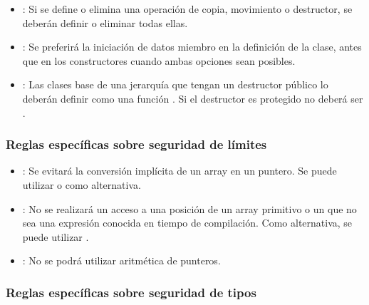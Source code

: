 \begin{itemize}
\item {}:
Si se define o elimina una operación de copia, movimiento o destructor, se
deberán definir o eliminar todas ellas.

\item {}:
Se preferirá la iniciación de datos miembro en la definición de la clase, antes
que en los constructores cuando ambas opciones sean posibles.

\item {}:
Las clases base de una jerarquía que tengan un destructor público lo deberán
definir como una función . Si el destructor es protegido no
deberá ser .

\end{itemize}

\subsubsection{Reglas específicas sobre seguridad de límites}

\begin{itemize}

\item {}:
Se evitará la conversión implícita de un array en un puntero.
Se puede utilizar  o 
como alternativa.

\item {}:
No se realizará un acceso a una posición de un array primitivo
o un  que no sea una expresión conocida en
tiempo de compilación. Como alternativa, se puede utilizar
.

\item {}:
No se podrá utilizar aritmética de punteros.

\end{itemize}

\subsubsection{Reglas específicas sobre seguridad de tipos}

